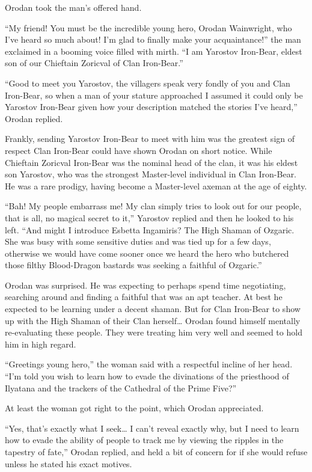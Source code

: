 \documentclass[a4paper,10pt]{book}
\begin{document}
Orodan took the man’s offered hand.\par
“My friend! You must be the incredible young hero, Orodan Wainwright, who I’ve heard so much about! I’m glad to finally make your acquaintance!” the man exclaimed in a booming voice filled with mirth. “I am Yarostov Iron-Bear, eldest son of our Chieftain Zoricval of Clan Iron-Bear.”\par
“Good to meet you Yarostov, the villagers speak very fondly of you and Clan Iron-Bear, so when a man of your stature approached I assumed it could only be Yarostov Iron-Bear given how your description matched the stories I’ve heard,” Orodan replied.\par
Frankly, sending Yarostov Iron-Bear to meet with him was the greatest sign of respect Clan Iron-Bear could have shown Orodan on short notice. While Chieftain Zoricval Iron-Bear was the nominal head of the clan, it was his eldest son Yarostov, who was the strongest Master-level individual in Clan Iron-Bear. He was a rare prodigy, having become a Master-level axeman at the age of eighty.\par
“Bah! My people embarrass me! My clan simply tries to look out for our people, that is all, no magical secret to it,” Yarostov replied and then he looked to his left. “And might I introduce Esbetta Ingamiris? The High Shaman of Ozgaric. She was busy with some sensitive duties and was tied up for a few days, otherwise we would have come sooner once we heard the hero who butchered those filthy Blood-Dragon bastards was seeking a faithful of Ozgaric.”\par
Orodan was surprised. He was expecting to perhaps spend time negotiating, searching around and finding a faithful that was an apt teacher. At best he expected to be learning under a decent shaman. But for Clan Iron-Bear to show up with the High Shaman of their Clan herself… Orodan found himself mentally re-evaluating these people. They were treating him very well and seemed to hold him in high regard.\par
“Greetings young hero,” the woman said with a respectful incline of her head. “I’m told you wish to learn how to evade the divinations of the priesthood of Ilyatana and the trackers of the Cathedral of the Prime Five?”\par
At least the woman got right to the point, which Orodan appreciated.\par
“Yes, that’s exactly what I seek… I can’t reveal exactly why, but I need to learn how to evade the ability of people to track me by viewing the ripples in the tapestry of fate,” Orodan replied, and held a bit of concern for if she would refuse unless he stated his exact motives.\par
\end{document}
